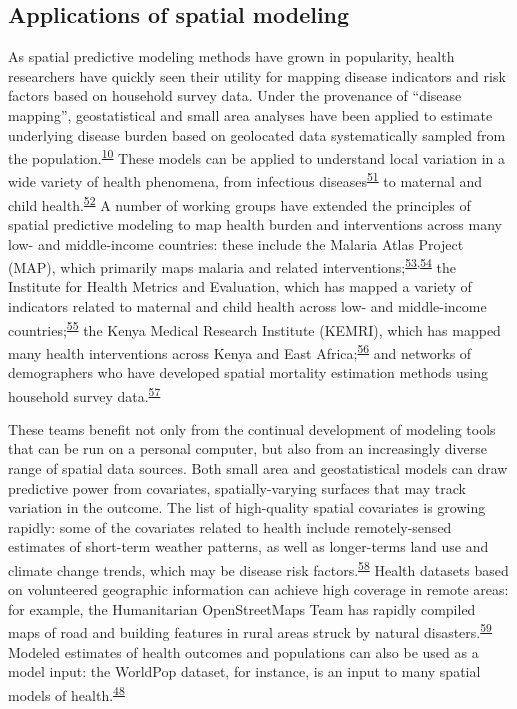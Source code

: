 \documentclass[
]{article}
\begin{document}
\hypertarget{applications-of-spatial-modeling}{%
\subsection{Applications of spatial modeling}\label{applications-of-spatial-modeling}}

As spatial predictive modeling methods have grown in popularity, health researchers have quickly seen their utility for mapping disease indicators and risk factors based on household survey data. Under the provenance of ``disease mapping'', geostatistical and small area analyses have been applied to estimate underlying disease burden based on geolocated data systematically sampled from the population.\textsuperscript{\protect\hyperlink{ref-Diggle2016}{10}} These models can be applied to understand local variation in a wide variety of health phenomena, from infectious diseases\textsuperscript{\protect\hyperlink{ref-Pigott2015}{51}} to maternal and child health.\textsuperscript{\protect\hyperlink{ref-Liang2019}{52}} A number of working groups have extended the principles of spatial predictive modeling to map health burden and interventions across many low- and middle-income countries: these include the Malaria Atlas Project (MAP), which primarily maps malaria and related interventions;\textsuperscript{\protect\hyperlink{ref-Weiss2019}{53},\protect\hyperlink{ref-Nguyen2019}{54}} the Institute for Health Metrics and Evaluation, which has mapped a variety of indicators related to maternal and child health across low- and middle-income countries;\textsuperscript{\protect\hyperlink{ref-Osgood-Zimmerman2018}{55}} the Kenya Medical Research Institute (KEMRI), which has mapped many health interventions across Kenya and East Africa;\textsuperscript{\protect\hyperlink{ref-Maina2019}{56}} and networks of demographers who have developed spatial mortality estimation methods using household survey data.\textsuperscript{\protect\hyperlink{ref-Wakefield2020}{57}}

These teams benefit not only from the continual development of modeling tools that can be run on a personal computer, but also from an increasingly diverse range of spatial data sources. Both small area and geostatistical models can draw predictive power from covariates, spatially-varying surfaces that may track variation in the outcome. The list of high-quality spatial covariates is growing rapidly: some of the covariates related to health include remotely-sensed estimates of short-term weather patterns, as well as longer-terms land use and climate change trends, which may be disease risk factors.\textsuperscript{\protect\hyperlink{ref-Ericksen2011}{58}} Health datasets based on volunteered geographic information can achieve high coverage in remote areas: for example, the Humanitarian OpenStreetMaps Team has rapidly compiled maps of road and building features in rural areas struck by natural disasters.\textsuperscript{\protect\hyperlink{ref-Thomson2019}{59}} Modeled estimates of health outcomes and populations can also be used as a model input: the WorldPop dataset, for instance, is an input to many spatial models of health.\textsuperscript{\protect\hyperlink{ref-Tatem2017}{48}}
\end{document}
